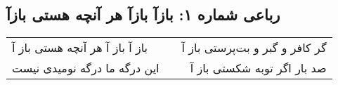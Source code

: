 \begin{center}
\section*{رباعی شماره ۱: بازآ بازآ هر آنچه هستی بازآ}
\label{sec:sh001}
\begin{longtable}{l p{0.5cm} r}
باز آ باز آ هر آنچه هستی باز آ
&&
گر کافر و گبر و بت‌پرستی باز آ
\\
این درگه ما درگه نومیدی نیست
&&
صد بار اگر توبه شکستی باز آ
\\
\end{longtable}
\end{center}
